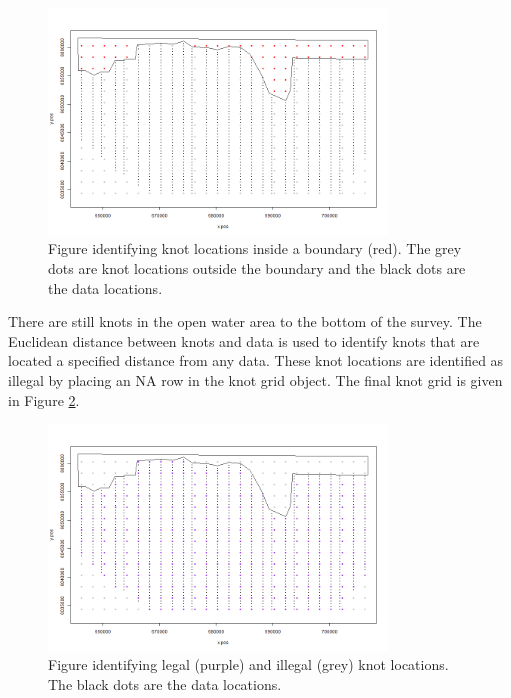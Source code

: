 \begin{figure}
\centering
\includegraphics[width=9cm]{knot1.png}
\caption{Figure identifying knot locations inside a boundary (red).  The grey dots are knot locations outside the boundary and the black dots are the data locations.}
\label{fig:knot1}
\end{figure}

\noindent There are still knots in the open water area to the bottom of the survey.  The Euclidean distance between knots and data is used to identify knots that are located a specified distance from any data.  These knot locations are identified as illegal by placing an NA row in the knot grid object. The final knot grid is given in Figure \ref{fig:knot2}. 
\begin{knitrout}\footnotesize
{}\color{fgcolor}
\end{knitrout}

\begin{figure}
\centering
\includegraphics[width=9cm]{knot3.png}
\caption{Figure identifying legal (purple) and illegal (grey) knot locations.  The black dots are the data locations.}
\label{fig:knot2}
\end{figure}

